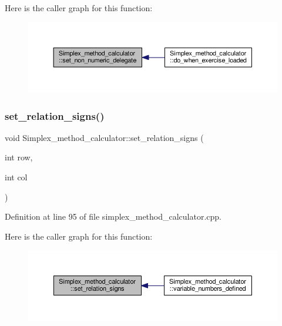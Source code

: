 Here is the caller graph for this function\+:\nopagebreak
\begin{figure}[H]
\begin{center}
\leavevmode
\includegraphics[width=350pt]{classSimplex__method__calculator_a71ee0dcab8e7d2b4df8daeb9345abf86_icgraph}
\end{center}
\end{figure}
\mbox{\label{classSimplex__method__calculator_ae6ef812805cc9013c137cd6f833c6017}} 
\subsubsection{\texorpdfstring{set\+\_\+relation\+\_\+signs()}{set\_relation\_signs()}}
{\footnotesize\ttfamily void Simplex\+\_\+method\+\_\+calculator\+::set\+\_\+relation\+\_\+signs (\begin{DoxyParamCaption}\item[{int}]{row,  }\item[{int}]{col }\end{DoxyParamCaption})\hspace{0.3cm}{\ttfamily [private]}}



Definition at line 95 of file simplex\+\_\+method\+\_\+calculator.\+cpp.

Here is the caller graph for this function\+:\nopagebreak
\begin{figure}[H]
\begin{center}
\leavevmode
\includegraphics[width=350pt]{classSimplex__method__calculator_ae6ef812805cc9013c137cd6f833c6017_icgraph}
\end{center}
\end{figure}
\mbox{\label{classSimplex__method__calculator_a18e84030946336020d9656ac4baf96d9}} 
